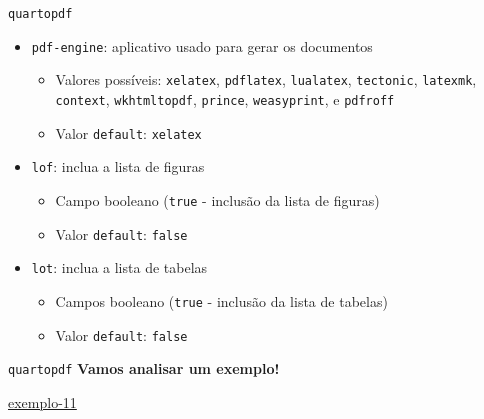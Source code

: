 \documentclass[
  10pt,
  ignorenonframetext,
]{beamer}
\providecommand{\tightlist}{%
  \setlength{\itemsep}{0pt}\setlength{\parskip}{0pt}}\usepackage{longtable,booktabs,array}
\begin{document}
\begin{frame}[fragile]{\texttt{quarto}\newline \texttt{pdf}}
\protect\hypertarget{quartopdf-2}{}
\begin{itemize}
\tightlist
\item
  \texttt{pdf-engine}: aplicativo usado para gerar os documentos

  \begin{itemize}
  \tightlist
  \item
    Valores possíveis: \texttt{xelatex}, \texttt{pdflatex},
    \texttt{lualatex}, \texttt{tectonic}, \texttt{latexmk},
    \texttt{context}, \texttt{wkhtmltopdf}, \texttt{prince},
    \texttt{weasyprint}, e \texttt{pdfroff}
  \item
    Valor \texttt{default}: \texttt{xelatex}
  \end{itemize}
\item
  \texttt{lof}: inclua a lista de figuras

  \begin{itemize}
  \tightlist
  \item
    Campo booleano (\texttt{true} - inclusão da lista de figuras)
  \item
    Valor \texttt{default}: \texttt{false}
  \end{itemize}
\item
  \texttt{lot}: inclua a lista de tabelas

  \begin{itemize}
  \tightlist
  \item
    Campos booleano (\texttt{true} - inclusão da lista de tabelas)
  \item
    Valor \texttt{default}: \texttt{false}
  \end{itemize}
\end{itemize}
\end{frame}

\begin{frame}{\texttt{quarto}\newline \texttt{pdf}}
\protect\hypertarget{quartopdf-3}{}
\textbf{Vamos analisar um exemplo!}

\href{https://ufbabr-my.sharepoint.com/:f:/g/personal/gilberto_sassi_ufba_br/Ehk4nU-6hABMlXzD-m2Ma-QBbs_hoTrcqELCTMF777q7Lg?e=GOKhhi}{exemplo-11}
\end{frame}
\end{document}
